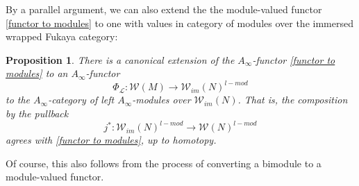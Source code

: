 \documentclass{amsart}
\newtheorem{proposition}[theorem]{Proposition}
\numberwithin{equation}{section}
\numberwithin{figure}{section}
\begin{document}
	By a parallel argument, we can also extend the the module-valued functor \eqref{functor to modules} to one with values in category of modules over the immersed wrapped Fukaya category: \par

\begin{proposition}
	There is a canonical extension of the $A_{\infty}$-functor \eqref{functor to modules} to an $A_{\infty}$-functor
\begin{equation} \label{functor to modules over the immersed category}
\Phi_{\mathcal{L}}: \mathcal{W}(M) \to \mathcal{W}_{im}(N)^{l-mod}
\end{equation}
to the $A_{\infty}$-category of left $A_{\infty}$-modules over $\mathcal{W}_{im}(N)$. That is, the composition by the pullback
\begin{equation*}
j^{*}: \mathcal{W}_{im}(N)^{l-mod} \to \mathcal{W}(N)^{l-mod}
\end{equation*}
agrees with \eqref{functor to modules}, up to homotopy.
\end{proposition}

	Of course, this also follows from the process of converting a bimodule to a module-valued functor. \par
\end{document}
